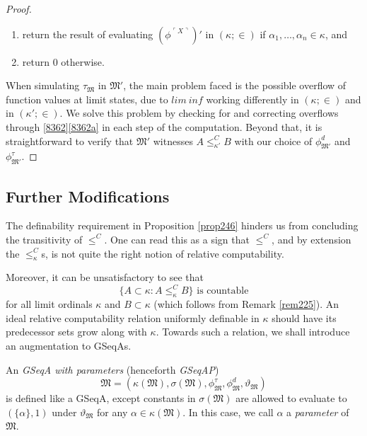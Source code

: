 \documentclass[12pt]{article}
\numberwithin{equation}{section}
\begin{document}
\begin{proof}
\begin{enumerate}[label=(\arabic*)]
\begin{enumerate}[label=(\alph*)]
        \item return the result of evaluating $(\phi^{\ulcorner X \urcorner})'$ in $(\kappa; \in)$ if $\alpha_1, \dots, \alpha_n \in \kappa$, and
        \item return $0$ otherwise.
    \end{enumerate}
\end{enumerate} 
When simulating $\tau_{\mathfrak{M}}$ in $\mathfrak{M}'$, the main problem faced is the possible overflow of function values at limit states, due to $lim \ inf$ working differently in $(\kappa; \in)$ and in $(\kappa'; \in)$. We solve this problem by checking for and correcting overflows through \ref{8362}\ref{8362a} in each step of the computation. Beyond that, it is straightforward to verify that $\mathfrak{M}'$ witnesses $A \leq^C_{\kappa'} B$ with our choice of $\phi^d_{\mathfrak{M}'}$ and $\phi^{\tau}_{\mathfrak{M}'}$.
\end{proof}

\subsection{Further Modifications}\label{ss320}

The definability requirement in Proposition \ref{prop246} hinders us from concluding the transitivity of $\leq^C$. One can read this as a sign that $\leq^C$, and by extension the $\leq^C_{\kappa}$s, is not quite the right notion of relative computability.

Moreover, it can be unsatisfactory to see that
\begin{equation*}
    \{A \subset \kappa : A \leq^C_{\kappa} B\} \text{ is countable}
\end{equation*}
for all limit ordinals $\kappa$ and $B \subset \kappa$ (which follows from Remark \ref{rem225}). An ideal relative computability relation uniformly definable in $\kappa$ should have its predecessor sets grow along with $\kappa$. Towards such a relation, we shall introduce an augmentation to GSeqAs.

\begin{defi}\label{def836}
An \emph{GSeqA with parameters} (henceforth \emph{GSeqAP}) 
\begin{equation*}
    \mathfrak{M} = (\kappa(\mathfrak{M}), \sigma(\mathfrak{M}), \phi^{\tau}_{\mathfrak{M}}, \phi^d_{\mathfrak{M}}, \vartheta_{\mathfrak{M}})
\end{equation*} 
is defined like a GSeqA, except constants in $\sigma(\mathfrak{M})$ are allowed to evaluate to $(\{\alpha\}, 1)$ under $\vartheta_{\mathfrak{M}}$ for any $\alpha \in \kappa(\mathfrak{M})$. In this case, we call $\alpha$ a \emph{parameter} of $\mathfrak{M}$.
\end{defi}
\end{document}
